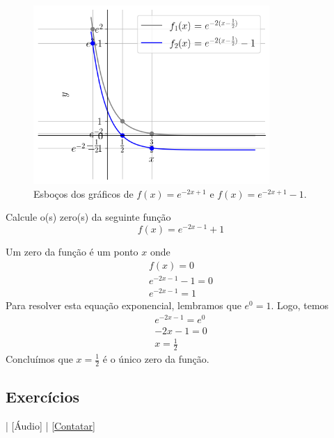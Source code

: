 \begin{resol}
  \begin{figure}[H]
    \centering
    \includegraphics[width=0.8\textwidth]{./cap_funcao/dados/fig_exeresol_funexp_graf/fig3}
    \caption{Esboços dos gráficos de $f(x) = e^{-2x+1}$ e $f(x) = e^{-2x+1}-1$.}
    \label{fig:exeresol_funexp_graf_3}
  \end{figure}
\end{resol}

\begin{exeresol}
  Calcule o(s) zero(s) da seguinte função
  \begin{equation}
    f(x) = e^{-2x-1}+1
  \end{equation}
\end{exeresol}
\begin{resol}
  Um zero da função é um ponto $x$ onde
  \begin{gather}
    f(x) = 0\\
    e^{-2x-1}-1 = 0\\
    e^{-2x-1} = 1
  \end{gather}
  Para resolver esta equação exponencial, lembramos que $e^0=1$. Logo, temos
  \begin{gather}
    e^{-2x-1} = e^0\\
    -2x-1 = 0\\
    x = \frac{1}{2}
  \end{gather}
  Concluímos que $x=\frac{1}{2}$ é o único zero da função.
\end{resol}

\subsection*{Exercícios}

\begin{flushright}
  [Vídeo] | [Áudio] | \href{https://phkonzen.github.io/notas/contato.html}{[Contatar]}
\end{flushright}

